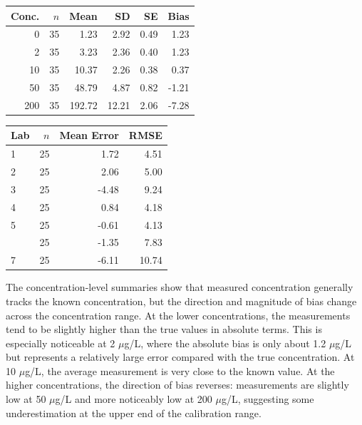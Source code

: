 \documentclass[
]{article}
\begin{document}
\begin{center}
\begin{minipage}[t]{0.62\textwidth}
\centering
\scriptsize
{}

\begin{tabular}{rrrrrr}
\toprule
Conc. & $n$ & Mean & SD & SE & Bias\\
\midrule
0 & 35 & 1.23 & 2.92 & 0.49 & 1.23\\
2 & 35 & 3.23 & 2.36 & 0.40 & 1.23\\
10 & 35 & 10.37 & 2.26 & 0.38 & 0.37\\
50 & 35 & 48.79 & 4.87 & 0.82 & -1.21\\
200 & 35 & 192.72 & 12.21 & 2.06 & -7.28\\
\bottomrule
\end{tabular}
\end{minipage}
\hfill
\begin{minipage}[t]{0.34\textwidth}
\centering
\scriptsize
{}

\begin{tabular}{lrrr}
\toprule
Lab & $n$ & Mean Error & RMSE\\
\midrule
1 & 25 & 1.72 & 4.51\\
2 & 25 & 2.06 & 5.00\\
3 & 25 & -4.48 & 9.24\\
4 & 25 & 0.84 & 4.18\\
5 & 25 & -0.61 & 4.13\\
\addlinespace
6 & 25 & -1.35 & 7.83\\
7 & 25 & -6.11 & 10.74\\
\bottomrule
\end{tabular}
\end{minipage}
\end{center}

The concentration-level summaries show that measured concentration
generally tracks the known concentration, but the direction and
magnitude of bias change across the concentration range. At the lower
concentrations, the measurements tend to be slightly higher than the
true values in absolute terms. This is especially noticeable at 2
\(\mu\)g/L, where the absolute bias is only about 1.2 \(\mu\)g/L but
represents a relatively large error compared with the true
concentration. At 10 \(\mu\)g/L, the average measurement is very close
to the known value. At the higher concentrations, the direction of bias
reverses: measurements are slightly low at 50 \(\mu\)g/L and more
noticeably low at 200 \(\mu\)g/L, suggesting some underestimation at the
upper end of the calibration range.
\end{document}
